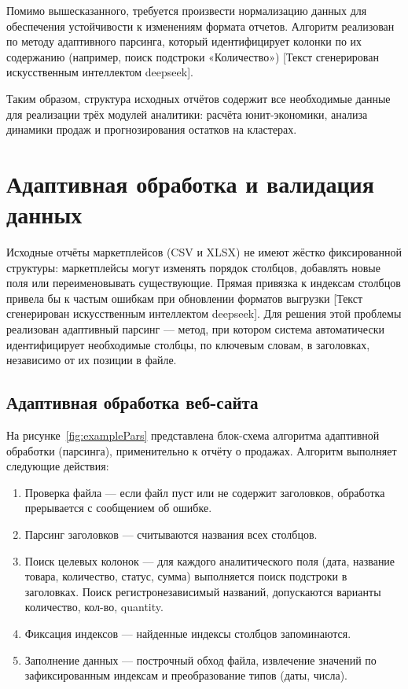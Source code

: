 Помимо вышесказанного, требуется произвести нормализацию данных для обеспечения устойчивости к изменениям формата отчетов. Алгоритм реализован по методу адаптивного парсинга, который идентифицирует колонки по их содержанию (например, поиск подстроки «Количество») [Текст сгенерирован искусственным интеллектом deepseek]. 

Таким образом, структура исходных отчётов содержит все необходимые данные для реализации трёх модулей аналитики: расчёта юнит-экономики, анализа динамики продаж и прогнозирования остатков на кластерах.

\section{Адаптивная обработка и валидация данных}

Исходные отчёты маркетплейсов (CSV и XLSX) не имеют жёстко фиксированной структуры: маркетплейсы могут изменять порядок столбцов, добавлять новые поля или переименовывать существующие. Прямая привязка к индексам столбцов привела бы к частым ошибкам при обновлении форматов выгрузки [Текст сгенерирован искусственным интеллектом deepseek]. Для решения этой проблемы реализован адаптивный парсинг — метод, при котором система автоматически идентифицирует необходимые столбцы, по ключевым словам, в заголовках, независимо от их позиции в файле.

\subsection{Адаптивная обработка веб-сайта}

На рисунке~\ref{fig:examplePars} представлена блок-схема алгоритма адаптивной обработки (парсинга), применительно к отчёту о продажах. Алгоритм выполняет следующие действия:
\begin{enumerate}
\item Проверка файла — если файл пуст или не содержит заголовков, обработка прерывается с сообщением об ошибке.
\item Парсинг заголовков — считываются названия всех столбцов.
\item Поиск целевых колонок — для каждого аналитического поля (дата, название товара, количество, статус, сумма) выполняется поиск подстроки в заголовках. Поиск регистронезависимый названий, допускаются варианты количество, кол-во, quantity.
\item Фиксация индексов — найденные индексы столбцов запоминаются.
\item Заполнение данных — построчный обход файла, извлечение значений по зафиксированным индексам и преобразование типов (даты, числа).
\end{enumerate}


